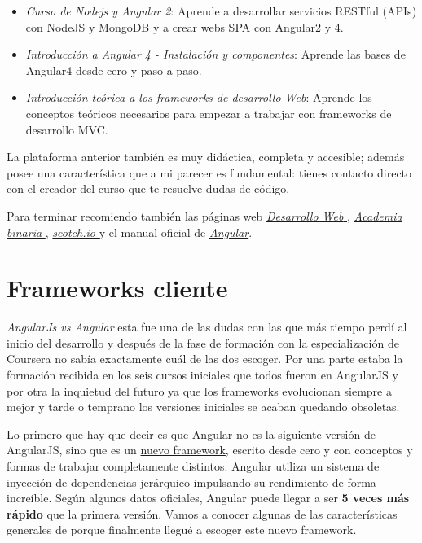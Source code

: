 \begin{itemize}
	\item \emph{Curso de Nodejs y Angular 2}: Aprende a desarrollar servicios RESTful (APIs) con NodeJS y MongoDB y a crear webs SPA con Angular2 y 4. \cite{curso1}
	\item  \emph{Introducción a Angular 4 - Instalación y componentes}: Aprende las bases de Angular4 desde cero y paso a paso. \cite{curso2}
	\item \emph{Introducción teórica a los frameworks de desarrollo Web}: Aprende los conceptos teóricos necesarios para empezar a trabajar con frameworks de desarrollo MVC. \cite{curso3}
\end{itemize}

La plataforma anterior también es muy didáctica, completa y accesible; además posee una característica que a mi parecer es fundamental: tienes contacto directo con el creador del curso que te resuelve dudas de código.

Para terminar recomiendo también las páginas web  \href{https://desarrolloweb.com/manuales/manual-angular-2.html}{\emph{Desarrollo Web }} \cite{desarrollo1} \cite{desarrollo2}, \href{http://academia-binaria.com/}{\emph{Academia binaria }} \cite{academia2}, \href{https://scotch.io/}{\emph{scotch.io }}  \cite{scotch1} y el manual oficial de \href{https://angular.io/docs/}{\emph{Angular}}.




 \section{Frameworks cliente}\label{cliente}
 
 \emph{AngularJs vs Angular } esta fue una de las dudas con las que más tiempo perdí al inicio del desarrollo y después de la fase de formación con la especialización de Coursera no sabía exactamente cuál de las dos escoger. Por una parte estaba la formación recibida en los seis cursos iniciales que todos fueron en AngularJS y por otra la inquietud del futuro ya que los frameworks evolucionan siempre a mejor y tarde o temprano los versiones iniciales se acaban quedando obsoletas. 
 
 Lo primero que hay que decir es que Angular no es la siguiente versión de AngularJS, sino que es un \underline{nuevo framework}, escrito desde cero y con conceptos y formas de trabajar completamente distintos. Angular utiliza un sistema de inyección de dependencias jerárquico impulsando su rendimiento de forma increíble.  Según algunos datos oficiales, Angular puede llegar a ser \textbf{5 veces más rápido} que la primera versión.  Vamos a conocer algunas de las características generales de porque finalmente llegué a escoger este nuevo framework. 
 
